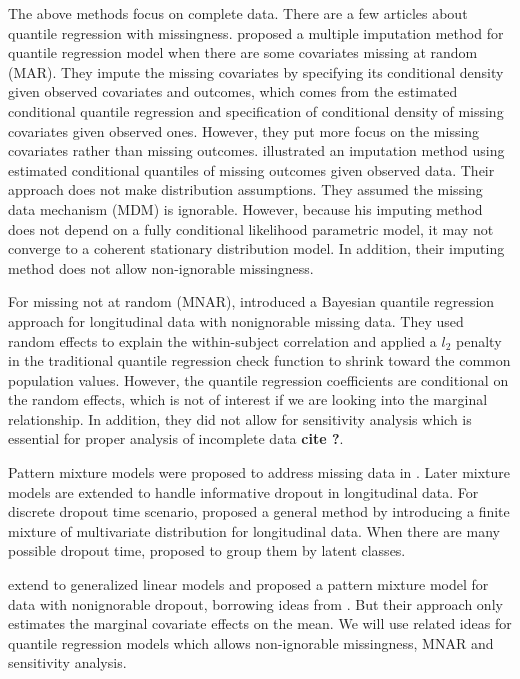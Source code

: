 \documentclass[12pt]{article}
\begin{document}
The above methods focus on complete data.  There are a few articles
about quantile regression with missingness.  \citet{wei2012} proposed
a multiple imputation method for quantile regression model when there
are some covariates missing at random (MAR). They impute the missing
covariates by specifying its conditional density given observed
covariates and outcomes, which comes from the estimated conditional
quantile regression and specification of conditional density of
missing covariates given observed ones.  However, they put more focus
on the missing covariates rather than missing outcomes.
\citet{bottai2013} illustrated an imputation method using estimated
conditional quantiles of missing outcomes given observed data. Their
approach does not make distribution assumptions.  They assumed the
missing data mechanism (MDM) is ignorable. However, because his
imputing method does not depend on a fully conditional likelihood
parametric model, it may not converge to a coherent stationary
distribution model. In addition, their imputing method does not allow
non-ignorable missingness.

For missing not at random (MNAR), \citet{yuan2010} introduced a
Bayesian quantile regression approach for longitudinal data with
nonignorable missing data. They used random effects to explain the
within-subject correlation and applied a $l_2$ penalty in the
traditional quantile regression check function to shrink toward the
common population values. However, the quantile regression
coefficients are conditional on the random effects, which is not of
interest if we are looking into the marginal relationship. In
addition, they did not allow for sensitivity analysis which is
essential for proper analysis of incomplete data {\bf cite ?}.

Pattern mixture models were proposed to address missing data in
\citet{rubin1977}. Later mixture models are extended to handle
informative dropout in longitudinal data. For discrete dropout time
scenario, \citet{little1993, little1994} proposed a general method by
introducing a finite mixture of multivariate distribution for
longitudinal data. When there are many possible dropout time,
\citet{roy2003} proposed to group them by latent classes.

\citet{roy2008} extend \cite{roy2003} to generalized linear models and
proposed a pattern mixture model for data with nonignorable dropout,
borrowing ideas from \citet{heagerty1999}.  But their approach only
estimates the marginal covariate effects on the mean. We will use
related ideas for quantile regression models which allows
non-ignorable missingness, MNAR and sensitivity analysis.
\end{document}

